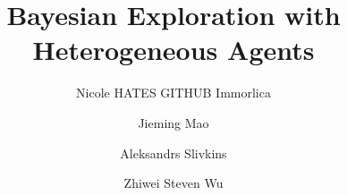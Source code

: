 \documentclass[sigconf, anonymous, review]{acmart}
\title{Bayesian Exploration with Heterogeneous Agents}
\author{
Nicole HATES GITHUB Immorlica
\and
Jieming Mao
\and
Aleksandrs Slivkins
\and
Zhiwei Steven Wu
}
\begin{document}
\begin{abstract}

\end{abstract}

\maketitle




















\appendix

\end{document}
